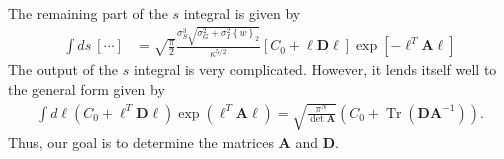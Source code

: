 \documentclass[11pt]{article}
\DeclareMathOperator{\Tr}{Tr}
\begin{document}
The remaining part of the $s$ integral is given by
\begin{align}
\int ds  \ [\cdots] &= \sqrt{\frac{\pi}{2}} \frac{\sigma_S^3 \sqrt{\sigma_G^2 +\sigma_I^2 \left\{w\right\}_2}}{\kappa^{5/2}} \left[C_0 + \boldsymbol{\ell} \mathbf{D} \boldsymbol{\ell}\right] \exp\left[-\boldsymbol{\ell}^T \mathbf{A} \boldsymbol{\ell}\right]
\end{align}
The output of the $s$ integral is very complicated. However, it lends itself well to the general form given by
\begin{align}
	\int d\boldsymbol{\ell} \left(C_0 +\boldsymbol{\ell}^T \mathbf{D} \boldsymbol{\ell}\right)\exp\left(\boldsymbol{\ell}^T \mathbf{A} \boldsymbol{\ell}\right) = \sqrt{\frac{\pi^N}{\det \mathbf{A}}}\left(C_0 + \Tr\left(\mathbf{D}\mathbf{A}^{-1}\right)\right).
\end{align}
Thus, our goal is to determine the matrices $\mathbf{A}$ and $\mathbf{D}$. 
\end{document}
